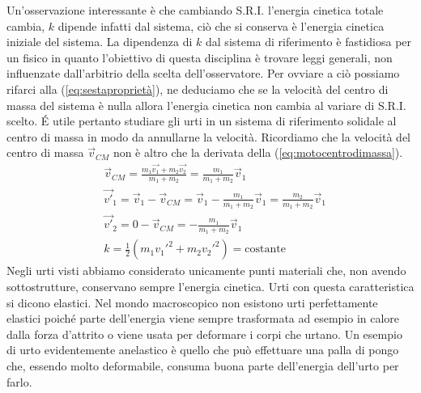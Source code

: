 \documentclass[10pt,a4paper]{article}
\begin{document}
Un'osservazione interessante è che cambiando S.R.I. l'energia cinetica totale cambia, $k$ dipende infatti dal sistema, ciò che si conserva è l'energia cinetica iniziale del sistema. La dipendenza di $k$ dal sistema di riferimento è fastidiosa per un fisico in quanto l'obiettivo di questa disciplina è trovare leggi generali, non influenzate dall'arbitrio della scelta dell'osservatore. Per ovviare a ciò possiamo rifarci alla (\ref{eq:sestaproprietà}), ne deduciamo che se la velocità del centro di massa del sistema è nulla allora l'energia cinetica non cambia al variare di S.R.I. scelto. \'{E} utile pertanto studiare gli urti in un sistema di riferimento solidale al centro di massa in modo da annullarne la velocità. Ricordiamo che la velocità del centro di massa $\vec{v}_{CM}$ non è altro che la derivata della (\ref{eq:motocentrodimassa}).
\begin{align*}
 &\vec{v}_{CM} = \frac{m_1\vec{v_1}+m_2\vec{v_2}}{m_1+m_2}= \frac{m_1}{m_1+m_2}\vec{v}_1\\
 &\vec{v'}_1 = \vec{v}_1 - \vec{v}_{CM} =  \vec{v}_1 - \frac{m_1}{m_1+m_2}\vec{v}_1 = \frac{m_2}{m_1 + m_2}\vec{v}_1\\
 &\vec{v'}_2 = 0 - \vec{v}_{CM} = -\frac{m_1}{m_1+m_2}\vec{v}_1\\
  &k = \frac{1}{2}(m_1 v_1'^2+m_2 v_2'^2) = \text{costante}
\end{align*}
Negli urti visti abbiamo considerato unicamente punti materiali che, non avendo sottostrutture, conservano sempre l'energia cinetica. Urti con questa caratteristica si dicono elastici. Nel mondo macroscopico non esistono urti perfettamente elastici poiché parte dell'energia viene sempre trasformata ad esempio in calore dalla forza d'attrito o viene usata per deformare i corpi che urtano. Un esempio di urto evidentemente anelastico è quello che può effettuare una palla di pongo che, essendo molto deformabile, consuma buona parte dell'energia dell'urto per farlo.
\end{document}
